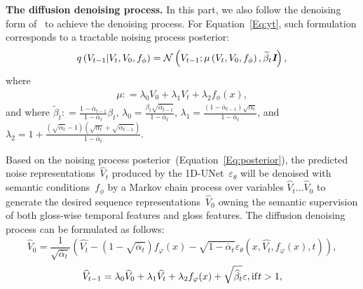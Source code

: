 \documentclass[sigconf]{acmart}
\begin{document}
\noindent\textbf{The diffusion denoising process.} 
In this part, we also follow the denoising form of~\cite{han2022card} to achieve the denoising process. 
For Equation~\ref{Eq:yt}, such formulation corresponds to a tractable noising process posterior:
\begin{equation}
    \begin{aligned}
q\left( {{V_{t - 1}}|{V_t},{V_0},{f_\phi }} \right) = {\mathcal{N}}\left( {{V_{t - 1}};\mu \left( {{V_t},{V_0},{f_\phi }} \right),{{\widetilde \beta }_t}\textit{\textbf{I}}} \right),
    \end{aligned}
    \label{Eq:posterior}
\end{equation}
\noindent where 
\begin{equation}
\begin{aligned}
    \mu : = {\lambda _0}{V_0} + {\lambda _1}{V_t} + {\lambda _2}{f_\phi }(x), 
\end{aligned}
\end{equation}
\noindent and where ${\widetilde \beta _t}: = \frac{{1 - {{\overline \alpha  }_{t - 1}}}}{{1 - {{\overline \alpha  }_t}}}{\beta _t}$, ${\lambda _0} = \frac{{{\beta _t}\sqrt {{{\overline \alpha  }_{t - 1}}} }}{{1 - {{\overline \alpha  }_t}}}$, ${\lambda _1} = \frac{{\left( {1 - {{\overline \alpha  }_{t - 1}}} \right)\sqrt {{\alpha _t}} }}{{1 - {{\overline \alpha  }_t}}}$, and ${\lambda _2} = 1 + \frac{{\left( {\sqrt {{{\overline \alpha  }_t}}  - 1} \right)\left( {\sqrt {{\alpha _t}}  + \sqrt {{{\overline \alpha  }_{t - 1}}} } \right)}}{{1 - {{\overline \alpha  }_t}}}$.

Based on the noising process posterior~(Equation~\ref{Eq:posterior}), 
the predicted noise representations~$\widehat V_t$ produced by the 1D-UNet~$\varepsilon_\theta$ will be denoised with semantic conditions~$f_\phi$ by a  Markov chain process over variables ${\widehat{V}_t...\widehat{V}_0}$ to generate the desired sequence representations~$\widehat{V}_0$ owning the semantic supervision of both gloss-wise temporal features and gloss features.
The diffusion denoising process can be formulated as follows:
\begin{equation}
    {\widehat V_0} = \frac{1}{{\sqrt {{{\overline \alpha  }_t}} }}\left( {\widehat{V_t} - \left( {1 - \sqrt {{{\overline \alpha  }_t}} } \right){f_\varphi }(x) - \sqrt {1 - {{\overline \alpha  }_t}} {\varepsilon _\theta }\left( {x,\widehat{V_t},{f_\varphi }(x),t} \right)} \right),
    \label{Eq:v_hat_0}
\end{equation}
\begin{equation}
    {\widehat{V}_{t - 1}} = {\lambda _0}{\widehat V_0} + {\lambda _1}\widehat{V_t} + {\lambda _2}{f_\varphi }(x) + \sqrt {{{\widehat \beta }_t}} \varepsilon, {\rm{  if }}t{\rm{ }} > 1{\rm{,}} \label{Eq:v_hat_t_1}
\end{equation}
\end{document}
